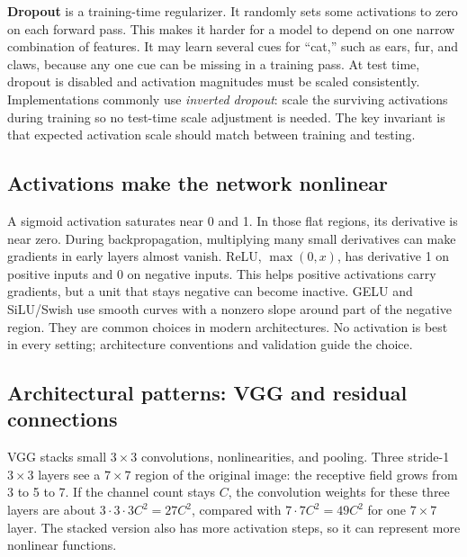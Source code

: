 \textbf{Dropout} is a training-time regularizer. It randomly sets some activations to zero on each forward pass. This makes it harder for a model to depend on one narrow combination of features. It may learn several cues for ``cat,'' such as ears, fur, and claws, because any one cue can be missing in a training pass. At test time, dropout is disabled and activation magnitudes must be scaled consistently. Implementations commonly use \emph{inverted dropout}: scale the surviving activations during training so no test-time scale adjustment is needed. The key invariant is that expected activation scale should match between training and testing.

\subsection{Activations make the network nonlinear}\label{04-visual-computing-ii-ch031-activations-make-the-network-nonlinear}

\hypertarget{04-visual-computing-ii-ch031-activations-make-the-network-nonlinear}{}

A sigmoid activation saturates near 0 and 1. In those flat regions, its derivative is near zero. During backpropagation, multiplying many small derivatives can make gradients in early layers almost vanish. ReLU, \(\max(0,x)\), has derivative 1 on positive inputs and 0 on negative inputs. This helps positive activations carry gradients, but a unit that stays negative can become inactive. GELU and SiLU/Swish use smooth curves with a nonzero slope around part of the negative region. They are common choices in modern architectures. No activation is best in every setting; architecture conventions and validation guide the choice.

\subsection{Architectural patterns: VGG and residual connections}\label{04-visual-computing-ii-ch031-architectural-patterns-vgg-and-residual-connections}

\hypertarget{04-visual-computing-ii-ch031-architectural-patterns-vgg-and-residual-connections}{}

VGG stacks small \(3\times3\) convolutions, nonlinearities, and pooling. Three stride-1 \(3\times3\) layers see a \(7\times7\) region of the original image: the receptive field grows from 3 to 5 to 7. If the channel count stays \(C\), the convolution weights for these three layers are about \(3\cdot3\cdot3C^2=27C^2\), compared with \(7\cdot7C^2=49C^2\) for one \(7\times7\) layer. The stacked version also has more activation steps, so it can represent more nonlinear functions.

